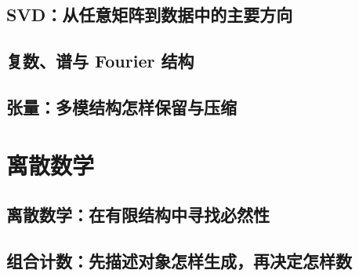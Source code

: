 \documentclass[UTF8,openany]{ctexbook}
\theoremstyle{definition}
\theoremstyle{plain}
\begin{document}
\chapter*{SVD：从任意矩阵到数据中的主要方向}
\label{ch:022}





\clearpage
\chapter*{复数、谱与 Fourier 结构}
\label{ch:023}




\clearpage
\chapter*{张量：多模结构怎样保留与压缩}
\label{ch:024}



\clearpage
\part{离散数学}
\chapter*{离散数学：在有限结构中寻找必然性}
\label{ch:025}

\clearpage
\chapter*{组合计数：先描述对象怎样生成，再决定怎样数}
\label{ch:026}





\clearpage
\end{document}
